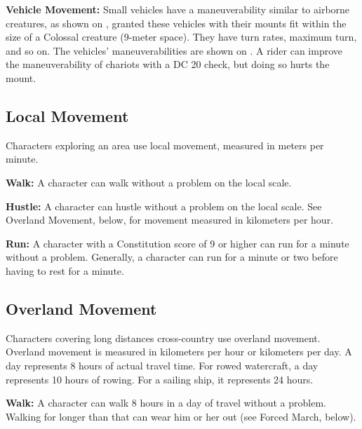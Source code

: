 \textbf{Vehicle Movement:} Small vehicles have a maneuverability similar to airborne creatures, as shown on , granted these vehicles with their mounts fit within the size of a Colossal creature (9-meter space). They have turn rates, maximum turn, and so on. The vehicles' maneuverabilities are shown on . A rider can improve the maneuverability of chariots with a DC 20  check, but doing so hurts the mount.



\subsection{Local Movement}
Characters exploring an area use local movement, measured in meters per minute.

\textbf{Walk:} A character can walk without a problem on the local scale.

\textbf{Hustle:} A character can hustle without a problem on the local scale. See Overland Movement, below, for movement measured in kilometers per hour.

\textbf{Run:} A character with a Constitution score of 9 or higher can run for a minute without a problem. Generally, a character can run for a minute or two before having to rest for a minute.

\subsection{Overland Movement}
Characters covering long distances cross-country use overland movement. Overland movement is measured in kilometers per hour or kilometers per day. A day represents 8 hours of actual travel time. For rowed watercraft, a day represents 10 hours of rowing. For a sailing ship, it represents 24 hours.

\textbf{Walk:} A character can walk 8 hours in a day of travel without a problem. Walking for longer than that can wear him or her out (see Forced March, below).

